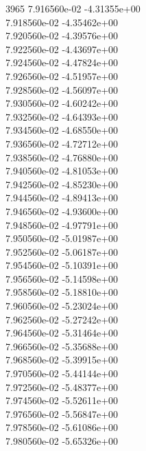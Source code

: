 3965	7.916560e-02	-4.31355e+00	\\ 	7.918560e-02	-4.35462e+00	\\ 	7.920560e-02	-4.39576e+00	\\ 	7.922560e-02	-4.43697e+00	\\ 	7.924560e-02	-4.47824e+00	\\ 	7.926560e-02	-4.51957e+00	\\ 	7.928560e-02	-4.56097e+00	\\ 	7.930560e-02	-4.60242e+00	\\ 	7.932560e-02	-4.64393e+00	\\ 	7.934560e-02	-4.68550e+00	\\ 	7.936560e-02	-4.72712e+00	\\ 	7.938560e-02	-4.76880e+00	\\ 	7.940560e-02	-4.81053e+00	\\ 	7.942560e-02	-4.85230e+00	\\ 	7.944560e-02	-4.89413e+00	\\ 	7.946560e-02	-4.93600e+00	\\ 	7.948560e-02	-4.97791e+00	\\ 	7.950560e-02	-5.01987e+00	\\ 	7.952560e-02	-5.06187e+00	\\ 	7.954560e-02	-5.10391e+00	\\ 	7.956560e-02	-5.14598e+00	\\ 	7.958560e-02	-5.18810e+00	\\ 	7.960560e-02	-5.23024e+00	\\ 	7.962560e-02	-5.27242e+00	\\ 	7.964560e-02	-5.31464e+00	\\ 	7.966560e-02	-5.35688e+00	\\ 	7.968560e-02	-5.39915e+00	\\ 	7.970560e-02	-5.44144e+00	\\ 	7.972560e-02	-5.48377e+00	\\ 	7.974560e-02	-5.52611e+00	\\ 	7.976560e-02	-5.56847e+00	\\ 	7.978560e-02	-5.61086e+00	\\ 	7.980560e-02	-5.65326e+00	\\ \hline
